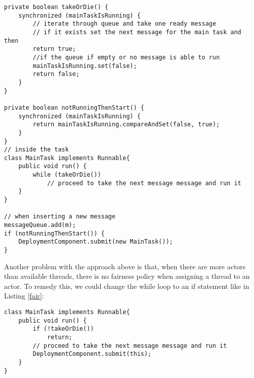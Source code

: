 \begin{lstlisting}[caption= Complete Synchronization for the Demand-Driven Approach, label=completesync]
private boolean takeOrDie() {
	synchronized (mainTaskIsRunning) {
		// iterate through queue and take one ready message 
		// if it exists set the next message for the main task and then
		return true;
		//if the queue if empty or no message is able to run
		mainTaskIsRunning.set(false);
		return false;
	}
}

private boolean notRunningThenStart() {
	synchronized (mainTaskIsRunning) {
		return mainTaskIsRunning.compareAndSet(false, true);
	}
}
// inside the task
class MainTask implements Runnable{
	public void run() {
		while (takeOrDie())
			// proceed to take the next message message and run it	 
	}
}

// when inserting a new message
messageQueue.add(m);
if (notRunningThenStart()) {
	DeploymentComponent.submit(new MainTask());
}
\end{lstlisting}

Another problem with the approach above is that, when there are more actors than available threads, there is no fairness policy when assigning a thread to an actor. To remedy this, we could change the while loop to an if statement like in Listing \ref{fair}:
\\

\begin{lstlisting}[caption= Fairness Between Actors, label=fair]
class MainTask implements Runnable{
	public void run() {
		if (!takeOrDie())
			return;
		// proceed to take the next message message and run it	 
		DeploymentComponent.submit(this);
	}
}
\end{lstlisting}





